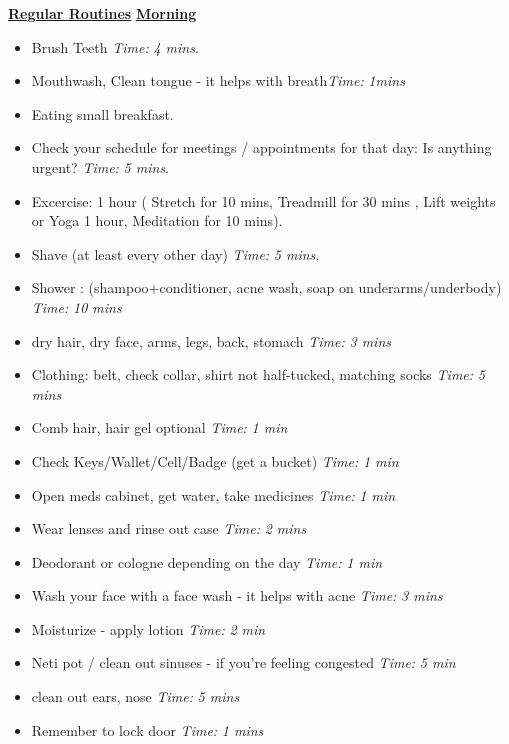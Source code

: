 \documentclass[11pt]{article}
\newcommand{\timeEst}[1]{\textit{Time:} \textit{#1}}
\begin{document}
          {\small \textbf{\underline{Regular Routines}} 
            \underline{\textbf{Morning}}
            \begin{itemize}
          \tiny \item \tiny Brush Teeth \timeEst{4 mins}.
        \item \tiny Mouthwash, Clean tongue - it helps with breath\timeEst{1mins}
        \item \tiny Eating small breakfast.
        \item \tiny Check your schedule for meetings / appointments for that day: Is anything urgent? \timeEst{5 mins}.
        \item \tiny Excercise: 1 hour ( Stretch for 10 mins, Treadmill for 30 mins , Lift weights or Yoga 1 hour, Meditation for 10 mins).
        \item \tiny Shave (at least every other day) \timeEst{5 mins}.
        \item \tiny Shower : (shampoo+conditioner, acne wash,  soap on underarms/underbody)
          \timeEst{10 mins}
        \item \tiny dry hair, dry face, arms, legs, back, stomach \timeEst{3 mins}
        \item \tiny Clothing: belt, check collar, shirt not half-tucked, matching socks \timeEst{5 mins}
        \item \tiny Comb hair, hair gel optional \timeEst{ 1 min}
        \item \tiny Check Keys/Wallet/Cell/Badge (get a bucket) \timeEst{1 min}
        \item \tiny Open meds cabinet, get water, take medicines \timeEst{1 min}
        \item \tiny Wear lenses and rinse out case \timeEst{ 2 mins}
        \item \tiny Deodorant or cologne depending on the day \timeEst{1 min}
        \item \tiny Wash your face with a face wash - it helps with acne \timeEst{3 mins}
        \item \tiny Moisturize - apply lotion \timeEst{ 2 min}
        \item \tiny Neti pot / clean out sinuses - if you’re feeling congested \timeEst{5 min}
        \item \tiny clean out ears, nose \timeEst{5 mins}
        \item \tiny Remember to lock door \timeEst{1 mins}
        \end{itemize}

}
\end{document}
